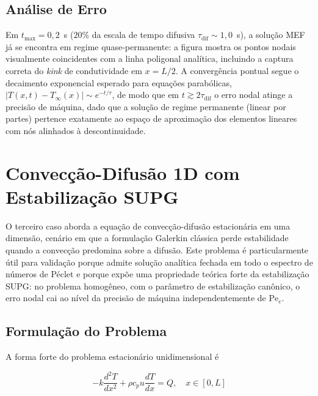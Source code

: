 \subsection{Análise de Erro}

Em $t_{\max} = 0{,}2$~s ($20\%$ da escala de tempo difusiva $\tau_{\mathrm{dif}} \sim 1{,}0$~s), a solução MEF já se encontra em regime quase-permanente: a figura mostra os pontos nodais visualmente coincidentes com a linha poligonal analítica, incluindo a captura correta do \emph{kink} de condutividade em $x = L/2$. A convergência pontual segue o decaimento exponencial esperado para equações parabólicas, $|T(x,t) - T_{\infty}(x)| \sim e^{-t/\tau}$, de modo que em $t \gtrsim 2\tau_{\mathrm{dif}}$ o erro nodal atinge a precisão de máquina, dado que a solução de regime permanente (linear por partes) pertence exatamente ao espaço de aproximação dos elementos lineares com nós alinhados à descontinuidade.


\section{Convecção-Difusão 1D com Estabilização SUPG}
\label{sec:val_convdif}

O terceiro caso aborda a equação de convecção-difusão estacionária em uma dimensão, cenário em que a formulação Galerkin clássica perde estabilidade quando a convecção predomina sobre a difusão. Este problema é particularmente útil para validação porque admite solução analítica fechada em todo o espectro de números de Péclet e porque expõe uma propriedade teórica forte da estabilização SUPG: no problema homogêneo, com o parâmetro de estabilização canônico, o erro nodal cai ao nível da precisão de máquina independentemente de $\mathrm{Pe}_e$.

\subsection{Formulação do Problema}

A forma forte do problema estacionário unidimensional é

\begin{equation}
    -k \frac{d^2 T}{dx^2} + \rho c_p u \frac{dT}{dx} = Q, \quad x \in [0, L]
    \label{eq:val_convdif_edp}
\end{equation}

